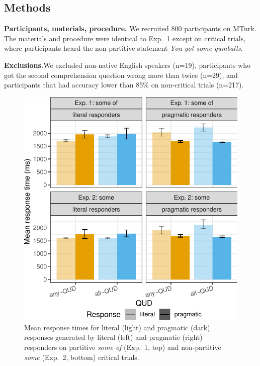 \documentclass[10pt,letterpaper]{article}
\begin{document}
\subsection{Methods}

\noindent \textbf{Participants, materials, procedure.} We recruited 800 participants on MTurk. %
The materials and procedure were identical to Exp.~1 except on critical trials, where participants heard the non-partitive statement \emph{You got some gumballs}.

\noindent \textbf{Exclusions.}We excluded non-native English speakers (n=19), participants who got the second comprehension question wrong more than twice (n=29), and participants that had accuracy lower than 85\% on non-critical trials (n=217).


\begin{figure}
\centering
  \includegraphics[width=\columnwidth]{plots/responsetimes}
  \caption{Mean response times for literal (light) and pragmatic (dark) responses generated by literal (left) and pragmatic (right) responders on partitive \emph{some of} (Exp.~1, top) and non-partitive \emph{some} (Exp.~2, bottom) critical trials. }
  \label{fig:responsetimes}
\end{figure}
\end{document}
